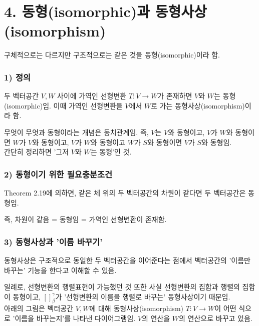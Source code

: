 \newpage


\section*{4. 동형(isomorphic)과 동형사상(isomorphism)}
구체적으로는 다르지만 구조적으로는 같은 것을 동형(isomorphic)이라 함.

\subsubsection*{1) 정의\\}
\begin{DEF}
두 벡터공간 $V,W$ 사이에 가역인 선형변환 $T:V \rightarrow W$가 존재하면 $V$와 $W$는 동형(isomorphic)임. 이때 가역인 선형변환을 $V$에서 $W$로 가는 동형사상(isomorphism)이라 함.
\end{DEF}

무엇이 무엇과 동형이라는 개념은 동치관계임. 즉, $V$는 $V$와 동형이고, $V$가 $W$와 동형이면 $W$가 $V$와 동형이고, $V$가 $W$와 동형이고 $W$가 $S$와 동형이면 $V$가 $S$와 동형임.\\
간단히 정리하면 '그저 $V$와 $W$는 동형'인 것.

\subsubsection*{2) 동형이기 위한 필요충분조건}
Theorem 2.19에 의하면, 같은 체 위의 두 벡터공간의 차원이 같다면 두 벡터공간은 동형임.

즉, 차원이 같음 = 동형임 = 가역인 선형변환이 존재함.

\subsubsection*{3) 동형사상과 '이름 바꾸기'}
동형사상은 구조적으로 동일한 두 벡터공간을 이어준다는 점에서 벡터공간의 '이름만 바꾸는' 기능을 한다고 이해할 수 있음.

일례로, 선형변환의 행렬표현이 가능했던 것 또한 사실 선형변환의 집합과 행렬의 집합이 동형이고, $[]_{\beta}^{\gamma}$가 '선형변환의 이름을 행렬로 바꾸는' 동형사상이기 때문임.\\

아래의 그림은 벡터공간 $V,W$에 대해 동형사상(isomorphism) $T:V \rightarrow W$이 어떤 식으로 '이름을 바꾸는지'를 나타낸 다이어그램임. $V$의 연산을 $W$의 연산으로 바꾸고 있음.



